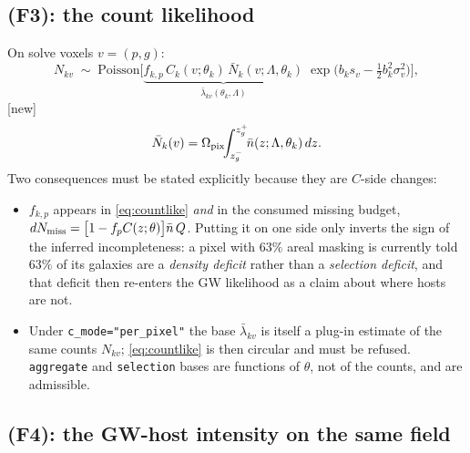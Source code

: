 \subsection{(F3): the count likelihood}

On solve voxels $v=(p,g)$:
\begin{equation}
  N_{kv}\;\sim\;\mathrm{Poisson}\Big[
  \underbrace{f_{k,p}\,C_k(v;\theta_k)\,\bar N_k(v;\Lambda,\theta_k)}_{\textstyle \bar\lambda_{kv}(\theta_k,\Lambda)}
  \;\exp\!\Big(b_k s_v-\tfrac12 b_k^2\sigma_v^2\Big)\Big],
  \label{eq:countlike}
\end{equation}
\hfill[new]
\begin{equation}
  \bar N_k(v)=\Omega_{\rm pix}\!\!\int_{z_g^-}^{z_g^+}\!\!\bar n(z;\Lambda,\theta_k)\,dz .
\end{equation}
Two consequences must be stated explicitly because they are $C$-side changes:
\begin{itemize}
\item $f_{k,p}$ appears in \eqref{eq:countlike} \emph{and} in the consumed
missing budget, $dN_{\rm miss}=\big[1-f_pC(z;\theta)\big]\bar n\,Q$.  Putting it
on one side only inverts the sign of the inferred incompleteness: a pixel with
$63\%$ areal masking is currently told $63\%$ of its galaxies are a
\emph{density deficit} rather than a \emph{selection deficit}, and that deficit
then re-enters the GW likelihood as a claim about where hosts are not.
\item Under \verb|c_mode="per_pixel"| the base $\bar\lambda_{kv}$ is itself a
plug-in estimate of the same counts $N_{kv}$; \eqref{eq:countlike} is then
circular and must be refused.  \verb|aggregate| and \verb|selection| bases are
functions of $\theta$, not of the counts, and are admissible.
\end{itemize}

\subsection{(F4): the GW-host intensity on the same field}

